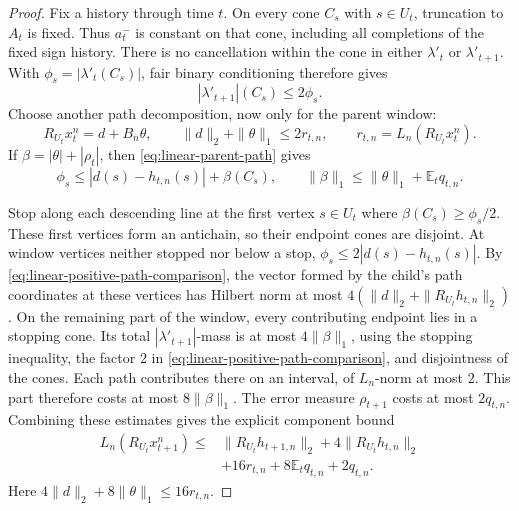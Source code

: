\begin{proof}
Fix a history through time \(t\).  On every cone \(C_s\) with
\(s\in U_t\), truncation to \(A_t\) is fixed.  Thus \(a_t^-\) is
constant on that cone, including all completions of the fixed sign
history.  There is no cancellation within the cone in either
\(\lambda'_t\) or \(\lambda'_{t+1}\).  With
\(\phi_s=|\lambda'_t(C_s)|\), fair binary conditioning therefore gives
\begin{equation}\label{eq:linear-positive-path-comparison}
 |\lambda'_{t+1}|(C_s)\le2\phi_s.
\end{equation}
Choose another path decomposition, now only for the parent window:
\[
 R_{U_t}x_t^n=d+B_n\theta,
 \qquad \|d\|_2+\|\theta\|_1\le2r_{t,n},
 \qquad r_{t,n}=L_n(R_{U_t}x_t^n).
\]
If \(\beta=|\theta|+|\rho_t|\), then
\eqref{eq:linear-parent-path} gives
\begin{equation}\label{eq:linear-stopping-domination}
 \phi_s\le|d(s)-h_{t,n}(s)|+\beta(C_s),
 \qquad \|\beta\|_1\le\|\theta\|_1+\mathbb E_tq_{t,n}.
\end{equation}

Stop along each descending line at the first vertex \(s\in U_t\)
where \(\beta(C_s)\ge\phi_s/2\).  These first vertices form an
antichain, so their endpoint cones are disjoint.  At window vertices
neither stopped nor below a stop,
\(\phi_s\le2|d(s)-h_{t,n}(s)|\).  By
\eqref{eq:linear-positive-path-comparison}, the vector formed by the
child's path coordinates at these vertices has Hilbert norm at most
\(4(\|d\|_2+\|R_{U_t}h_{t,n}\|_2)\).
On the remaining part of the window, every contributing endpoint lies
in a stopping cone.  Its total \(|\lambda'_{t+1}|\)-mass is at most
\(4\|\beta\|_1\), using the stopping inequality, the factor \(2\) in
\eqref{eq:linear-positive-path-comparison}, and disjointness of the
cones.  Each path contributes there on an interval, of \(L_n\)-norm
at most \(2\).  This part therefore costs at most \(8\|\beta\|_1\).
The error measure \(\rho_{t+1}\) costs at most \(2q_{t,n}\).
Combining these estimates gives the explicit component bound
\begin{equation}\label{eq:linear-sign-window}
 \begin{split}
 L_n(R_{U_t}x_{t+1}^n)\le{}&
 \|R_{U_t}h_{t+1,n}\|_2+4\|R_{U_t}h_{t,n}\|_2\\
 &+16r_{t,n}+8\mathbb E_tq_{t,n}+2q_{t,n}.
 \end{split}
\end{equation}
Here \(4\|d\|_2+8\|\theta\|_1\le16r_{t,n}\).


\end{proof}
